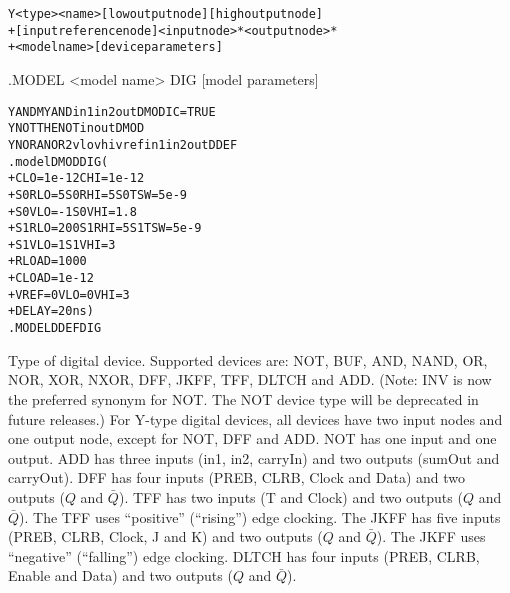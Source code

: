

 
\begin{Device}\label{YTypeDigitalDevice}

\device
\begin{alltt}
Y<type> <name> [low output node] [high output node]
+ [input reference node] <input node>* <output node>*
+  <model name> [device parameters]
\end{alltt}

\model
.MODEL <model name> DIG [model parameters]

\examples
\begin{alltt}
YAND MYAND in1 in2 out DMOD IC=TRUE
YNOT THENOT in out DMOD
YNOR ANOR2 vlo vhi vref in1 in2 out DDEF
.model DMOD DIG (
+ CLO=1e-12  CHI=1e-12
+ S0RLO=5  S0RHI=5  S0TSW=5e-9
+ S0VLO=-1  S0VHI=1.8
+ S1RLO=200  S1RHI=5  S1TSW=5e-9
+ S1VLO=1  S1VHI=3
+ RLOAD=1000
+ CLOAD=1e-12
+ VREF=0 VLO=0 VHI=3
+ DELAY=20ns )
.MODEL DDEF DIG
\end{alltt}

\parameters
\begin{Parameters}

Type of digital device.  Supported devices are: NOT, BUF, AND, NAND, OR, NOR, XOR,
NXOR, DFF, JKFF, TFF, DLTCH and ADD.  (Note: INV is now the preferred synonym for NOT.  
The NOT device type will be deprecated in future \Xyce{} releases.)  For Y-type digital
devices, all devices have two input nodes and one output node, except for NOT, DFF and
ADD.  NOT has one input and one output.  ADD has three inputs (in1, in2, carryIn) and 
two outputs (sumOut and carryOut).  DFF has four inputs (PREB, CLRB, Clock and
Data) and two outputs ($Q$ and $\bar{Q}$). TFF has two inputs (T and Clock) and two
outputs ($Q$ and $\bar{Q}$).  The TFF uses ``positive'' (``rising'') edge clocking.
The JKFF has five inputs (PREB, CLRB, Clock, J and K) and two outputs ($Q$ and $\bar{Q}$).
The JKFF uses ``negative'' (``falling'') edge clocking.
DLTCH has four inputs (PREB, CLRB, Enable and Data) and two outputs ($Q$ and $\bar{Q}$). 


\end{Parameters}
\end{Device}
